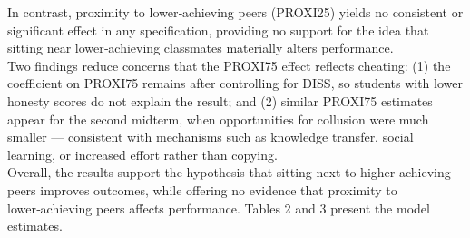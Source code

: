 \documentclass[]{article}
\begin{document}
	In contrast, proximity to lower‑achieving peers (PROXI25) yields no consistent or significant effect in any specification, providing no support for the idea that sitting near lower‑achieving classmates materially alters performance.\\
	
	Two findings reduce concerns that the PROXI75 effect reflects cheating: (1) the coefficient on PROXI75 remains after controlling for DISS, so students with lower honesty scores do not explain the result; and (2) similar PROXI75 estimates appear for the second midterm, when opportunities for collusion were much smaller — consistent with mechanisms such as knowledge transfer, social learning, or increased effort rather than copying.\\
	
	Overall, the results support the hypothesis that sitting next to higher‑achieving peers improves outcomes, while offering no evidence that proximity to lower‑achieving peers affects performance. Tables 2 and 3 present the model estimates.
	
\end{document}
